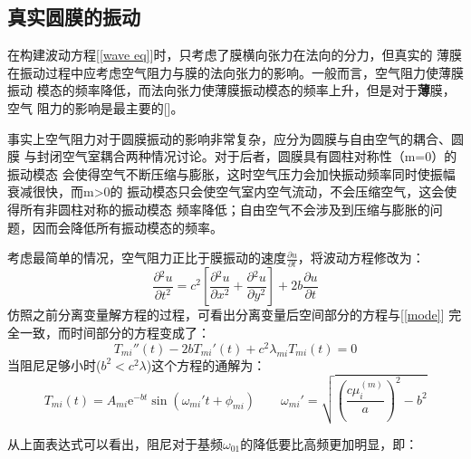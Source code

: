 \documentclass[a4paper]{ctexart}
\def\e{\mathrm{e}}
\newcommand{\pdv}[2]{\frac{\partial{#1}}{\partial{#2}}}
\begin{document}
	\subsection{真实圆膜的振动}
	\par 
	在构建波动方程[\ref{wave eq}]时，只考虑了膜横向张力在法向的分力，但真实的
	薄膜在振动过程中应考虑空气阻力与膜的法向张力的影响。一般而言，空气阻力使薄膜振动
	模态的频率降低，而法向张力使薄膜振动模态的频率上升，但是对于\textbf{薄}膜，空气
	阻力的影响是最主要的[\cite{phy_of_music}]。
	\par 事实上空气阻力对于圆膜振动的影响非常复杂，应分为圆膜与自由空气的耦合、圆膜
	与封闭空气室耦合两种情况讨论。对于后者，圆膜具有圆柱对称性（m=0）的振动模态
	会使得空气不断压缩与膨胀，这时空气压力会加快振动频率同时使振幅衰减很快，而m>0的
	振动模态只会使空气室内空气流动，不会压缩空气，这会使得所有非圆柱对称的振动模态
	频率降低；自由空气不会涉及到压缩与膨胀的问题，因而会降低所有振动模态的频率。
	\par
	考虑最简单的情况，空气阻力正比于膜振动的速度$\pdv{u}{t}$，将波动方程修改为：
	\begin{equation}
		\pdv{^2u}{t^2} = c^2\left[\pdv{^2u}{x^2} + \pdv{^2u}{y^2}\right] + 2b\pdv{u}{t}
	\end{equation}   
	仿照之前分离变量解方程的过程，可看出分离变量后空间部分的方程与[\ref{mode}]
	完全一致，而时间部分的方程变成了：
	\begin{equation}
		T_{mi}{''}(t) - 2bT_{mi}{'}(t) + c^2 \lambda_{mi} T_{mi}(t) = 0
	\end{equation}
	当阻尼足够小时($b^2 < c^2 \lambda$)这个方程的通解为：
	\begin{equation}
		T_{mi}(t) = A_{mi}\e^{-bt}\sin(\omega_{mi}{'}t + \phi_{mi})\quad\quad \omega_{mi}{'} = \sqrt{\left(\frac{c\mu_{i}^{(m)}}{a}\right)^2 - b^2}
	\end{equation}
	\par 从上面表达式可以看出，阻尼对于基频$\omega_{01}$的降低要比高频更加明显，即：
\end{document}
